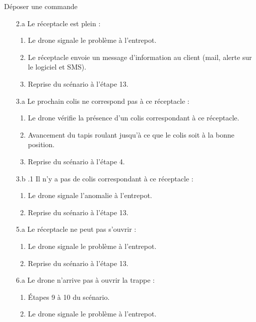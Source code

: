 \begin{UseCase}{Déposer une commande}
\begin{UseCaseExtension}
    \begin{enumerate}
        \item[2.a] Le réceptacle est plein :
            \begin{enumerate}
                \item Le drone signale le problème à l'entrepot.
                \item Le réceptacle envoie un message d'information au client
                    (mail, alerte sur le logiciel et SMS).
                \item Reprise du scénario à l'étape 13.
            \end{enumerate}
        \item[3.a] Le prochain colis ne correspond pas à ce réceptacle :
            \begin{enumerate}
                \item Le drone vérifie la présence d'un colis correspondant à
                    ce réceptacle.
                \item Avancement du tapis roulant jusqu'à ce que le colis soit
                    à la bonne position.
                \item Reprise du scénario à l'étape 4.
            \end{enumerate}
        \item[3.b].1 Il n'y a pas de colis correspondant à ce réceptacle :
            \begin{enumerate}
                \item Le drone signale l'anomalie à l'entrepot.
                \item Reprise du scénario à l'étape 13.
            \end{enumerate}
        \item[5.a] Le réceptacle ne peut pas s'ouvrir :
            \begin{enumerate}
                \item Le drone signale le problème à l'entrepot.
                \item Reprise du scénario à l'étape 13.
            \end{enumerate}
        \item[6.a] Le drone n'arrive pas à ouvrir la trappe :
            \begin{enumerate}
                \item Étapes 9 à 10 du scénario.
                \item Le drone signale le problème à l'entrepot.

\end{enumerate}
\end{enumerate}
\end{UseCaseExtension}
\end{UseCase}
